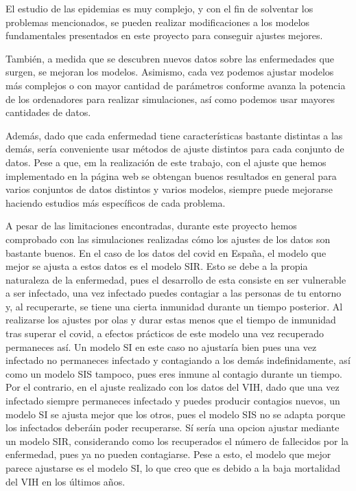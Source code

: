 El estudio de las epidemias es muy complejo, y con el fin de solventar los problemas mencionados, se pueden realizar modificaciones a los modelos fundamentales presentados en este proyecto para conseguir ajustes mejores.

También, a medida que se descubren nuevos datos sobre las enfermedades que surgen, se mejoran los modelos. Asimismo, cada vez podemos ajustar modelos más complejos o con mayor cantidad de parámetros conforme avanza la potencia de los ordenadores para realizar simulaciones, así como podemos usar mayores cantidades de datos.

Además, dado que cada enfermedad tiene características bastante distintas a las demás, sería conveniente usar métodos de ajuste distintos para cada conjunto de datos. Pese a que, em la realización de este trabajo, con el ajuste que hemos implementado en la página web se obtengan buenos resultados en general para varios conjuntos de datos distintos y varios modelos, siempre puede mejorarse haciendo estudios más específicos de cada problema.

A pesar de las limitaciones encontradas, durante este proyecto hemos comprobado con las simulaciones realizadas cómo los ajustes de los datos son bastante buenos. En el caso de los datos del covid en España, el modelo que mejor se ajusta a estos datos es el modelo SIR. Esto se debe a la propia naturaleza de la enfermedad, pues el desarrollo de esta consiste en ser vulnerable a ser infectado, una vez infectado puedes contagiar a las personas de tu entorno y, al recuperarte, se tiene una cierta inmunidad durante un tiempo posterior. Al realizarse los ajustes por olas y durar estas menos que el tiempo de inmunidad tras superar el covid, a efectos prácticos de este modelo una vez recuperado permaneces así. Un modelo SI en este caso no ajustaría bien pues una vez infectado no permaneces infectado y contagiando a los demás indefinidamente, así como un modelo SIS tampoco, pues eres inmune al contagio durante un tiempo. Por el contrario, en el ajuste realizado con los datos del VIH, dado que una vez infectado siempre permaneces infectado y puedes producir contagios nuevos, un modelo SI se ajusta mejor que los otros, pues el modelo SIS no se adapta porque los infectados deberáin poder recuperarse. Sí sería una opcion ajustar mediante un modelo SIR, considerando como los recuperados el número de fallecidos por la enfermedad, pues ya no pueden contagiarse. Pese a esto, el modelo que mejor parece ajustarse es el modelo SI, lo que creo que es debido a la baja mortalidad del VIH en los últimos años.

